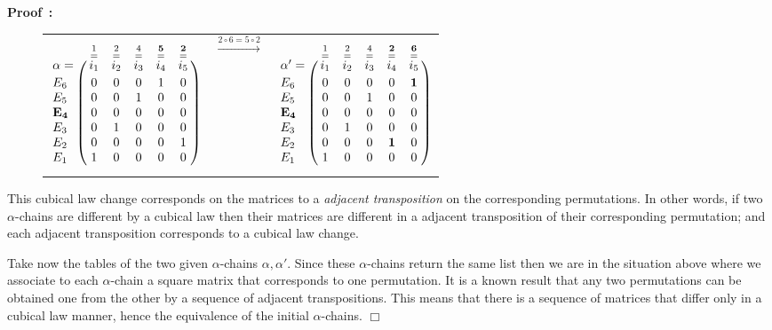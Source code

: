 \documentclass[submission,copyright,creativecommons]{eptcs}
\newenvironment{proof}[1][\!\!\,]{\vspace{1ex}\noindent\textbf{Proof #1: }}{\hfill$\Box$\vspace{2ex}}
\newcommand{\transition}[1]{\ensuremath{\xrightarrow{#1}}}
\begin{document}
\begin{proof}
\begin{figure}[tp]
\begin{tabular}{lll}
$$
\bordermatrix{ \alpha= & \overset{1}{\overset{=}{i_1}} & \overset{2}{\overset{=}{i_2}} & \overset{4}{\overset{=}{i_{3}}} & \overset{\mathbf{5}}{\overset{=}{i_{4}}} & \overset{\mathbf{2}}{\overset{=}{i_5}}  \cr
                E_{6} & 0 & 0 & 0 & 1 & 0\cr
                E_{5} & 0 & 0 & 1 & 0 & 0\cr
                \mathbf{E_{4}} & 0 & 0 & 0 & 0 & 0\cr
                E_{3} & 0 & 1 & 0 & 0 & 0\cr
                E_{2} & 0 & 0 & 0 & 0 & 1\cr
                E_{1} & 1 & 0 & 0 & 0 & 0
}
$$
&
$\transition{2\circ 6=5\circ 2}$
&
$$
\bordermatrix{ \alpha'= & \overset{1}{\overset{=}{i_1}} & \overset{2}{\overset{=}{i_2}} & \overset{4}{\overset{=}{i_{3}}} & \overset{\mathbf{2}}{\overset{=}{i_{4}}} & \overset{\mathbf{6}}{\overset{=}{i_5}}  \cr
                E_{6} & 0 & 0 & 0 & 0 & \mathbf{1}\cr
                E_{5} & 0 & 0 & 1 & 0 & 0\cr
                \mathbf{E_{4}} & 0 & 0 & 0 & 0 & 0\cr
                E_{3} & 0 & 1 & 0 & 0 & 0\cr
                E_{2} & 0 & 0 & 0 & \mathbf{1} & 0\cr
                E_{1} & 1 & 0 & 0 & 0 & 0
}
$$\\
\end{tabular} 

\caption{}
\label{fig_ex_matrix}
\end{figure}



This cubical law change corresponds on the matrices to a \textit{adjacent transposition} on the corresponding permutations. In other words, if two $\alpha$-chains are different by a cubical law then their matrices are different in a adjacent transposition of their corresponding permutation; and each adjacent transposition corresponds to a cubical law change.

Take now the tables of the two given $\alpha$-chains $\alpha,\alpha'$. Since these $\alpha$-chains return the same list then we are in the situation above where we associate to each $\alpha$-chain a square matrix that corresponds to one permutation. It is a known result that any two permutations can be obtained one from the other by a sequence of adjacent transpositions. This means that there is a sequence of matrices that differ only in a cubical law manner, hence the equivalence of the initial $\alpha$-chains.
\end{proof}
\end{document}
